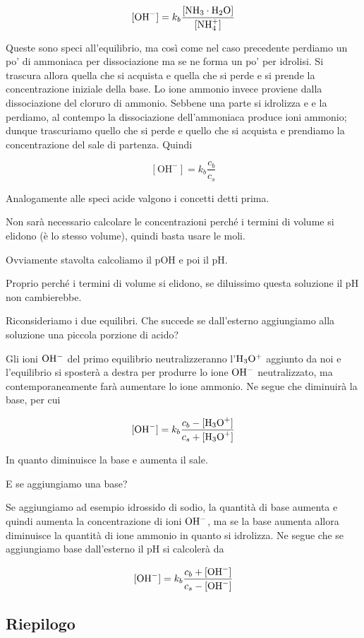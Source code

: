 $$[\text{OH}^-] = k_b \rm{\frac{[NH_3 \cdot H_2O]}{[NH_4^+]}}$$

Queste sono speci all'equilibrio, ma così come nel caso precedente perdiamo un po' di ammoniaca per dissociazione ma se ne forma un po' per idrolisi. Si trascura allora quella che si acquista e quella che si perde e si prende la concentrazione iniziale della base. Lo ione ammonio invece proviene dalla dissociazione del cloruro di ammonio. Sebbene una parte si idrolizza e e la perdiamo, al contempo la dissociazione dell'ammoniaca produce ioni ammonio; dunque trascuriamo quello che si perde e quello che si acquista e prendiamo la concentrazione del sale di partenza. Quindi

$$[\text{OH}^-] = k_b \frac{c_b}{c_s}$$

Analogamente alle speci acide valgono i concetti detti prima.

Non sarà necessario calcolare le concentrazioni perché i termini di volume si elidono (è lo stesso volume), quindi basta usare le moli.

Ovviamente stavolta calcoliamo il pOH e poi il pH.

Proprio perché i termini di volume si elidono, se diluissimo questa soluzione il pH non cambierebbe.

\vspace{0.2cm}Riconsideriamo i due equilibri. Che succede se dall'esterno aggiungiamo alla soluzione una piccola porzione di acido?

Gli ioni $\rm OH^-$ del primo equilibrio neutralizzeranno l'$\rm H_3O^+$ aggiunto da noi e l'equilibrio si sposterà a destra per produrre lo ione $\rm OH^-$ neutralizzato, ma contemporaneamente farà aumentare lo ione ammonio. Ne segue che diminuirà la base, per cui

$${[\text{OH}^-]}=k_b \frac{c_b - \rm{[\text{H}_3\text{O}^+]}}{c_s + \rm{[\text{H}_3\text{O}^+]}}$$

In quanto diminuisce la base e aumenta il sale.

E se aggiungiamo una base?

Se aggiungiamo ad esempio idrossido di sodio, la quantità di base aumenta e quindi aumenta la concentrazione di ioni $\rm OH^-$, ma se la base aumenta allora diminuisce la quantità di ione ammonio in quanto si idrolizza. Ne segue che se aggiungiamo base dall'esterno il pH si calcolerà da

$${[\text{OH}^-]}=k_b \frac{c_b + {[\text{OH}^-]}}{c_s - \rm{[\text{OH}^-]}}$$

\subsection{Riepilogo}

